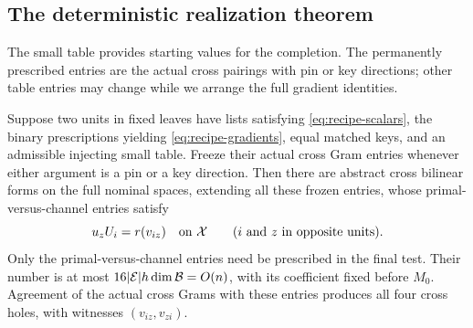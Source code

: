 \subsection{The deterministic realization theorem}

The small table provides starting values for the completion.
The permanently prescribed entries are the actual cross pairings
with pin or key directions; other table entries may change while
we arrange the full gradient identities.

\begin{theorem}\label{thm:gradient-realization}
Suppose two units in fixed leaves have lists satisfying
\eqref{eq:recipe-scalars}, the binary prescriptions yielding
\eqref{eq:recipe-gradients}, equal matched keys, and an
admissible injecting small table.  Freeze their actual cross
Gram entries whenever either argument is a pin or a key
direction.  Then there are abstract cross bilinear forms on
the full nominal spaces, extending all these frozen entries,
whose primal-versus-channel entries satisfy
\begin{equation}\label{eq:realized-gradients}
 u_zU_i=r(v_{iz})\quad\text{on }\mathcal X
 \qquad(i\text{ and }z\text{ in opposite units}).
\end{equation}
Only the primal-versus-channel entries need be prescribed in
the final test.  Their number is at most
$16|\mathcal E|h\dim\mathcal B=O(n)$, with its coefficient fixed before
$M_0$.  Agreement of the actual cross Grams with these entries
produces all four cross holes, with witnesses $(v_{iz},v_{zi})$.
\end{theorem}
